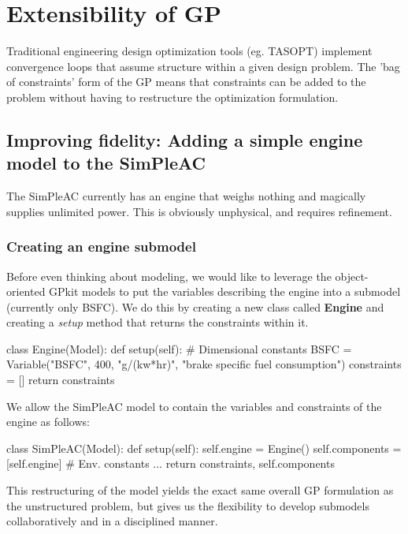 \chapter{Extensibility of GP}
\label{ch3:extensibility}

Traditional engineering design optimization tools (eg. TASOPT) implement
convergence loops that assume structure within a given design problem.
The 'bag of constraints' form of the GP means that constraints can be
added to the problem without
having to restructure the optimization formulation.

\section{Improving fidelity: Adding a simple engine model to the SimPleAC}
\label{s:engine}

The SimPleAC currently has an engine that weighs nothing and magically supplies
unlimited power. This is obviously unphysical, and requires refinement.

\subsection{Creating an engine submodel}

Before even thinking about modeling, we would like to leverage the object-oriented
GPkit models to put the variables describing the engine into a submodel (currently only
BSFC). We do this by creating a new class called \textbf{Engine} and creating a \textit{setup}
method that returns the constraints within it.

\begin{python}
    class Engine(Model):
    def setup(self):
    # Dimensional constants
    BSFC = Variable("BSFC", 400, "g/(kw*hr)", "brake specific fuel consumption")
    constraints = []
    return constraints
\end{python}

We allow the SimPleAC model to contain the variables and constraints of the engine
as follows:

\begin{python}
    class SimPleAC(Model):
    def setup(self):
    self.engine = Engine()
    self.components = [self.engine]
    # Env. constants
    ...
    return constraints, self.components
\end{python}

This restructuring of the model yields the exact same overall \gls{GP} formulation
as the unstructured problem, but gives us the flexibility to develop submodels
collaboratively and in a disciplined manner.

